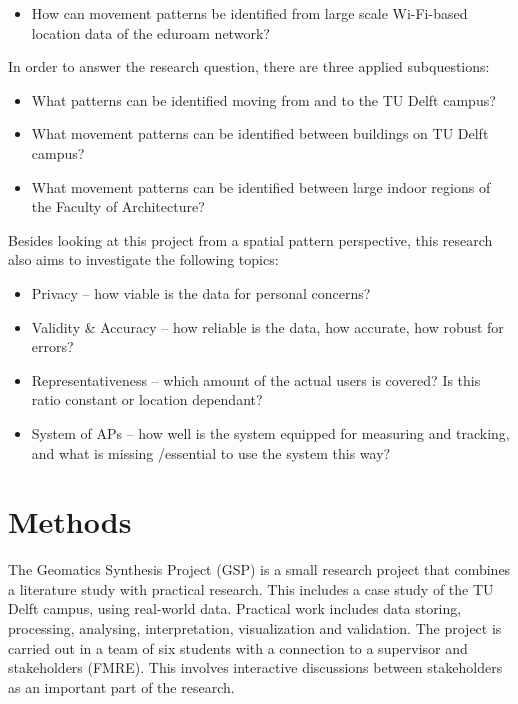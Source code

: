 \begin{itemize}
\item How can movement patterns be identified from large scale Wi-Fi-based location data of the eduroam network?
\end{itemize}
In order to answer the research question, there are three applied subquestions:
\begin{itemize}
\item What patterns can be identified moving from and to the TU Delft campus?
\item What movement patterns can be identified between buildings on TU Delft campus?
\item What movement patterns can be identified between large indoor regions of the Faculty of Architecture?
\end{itemize}
Besides looking at this project from a spatial pattern perspective, this research also aims to investigate the following topics:
\begin{itemize}
\item Privacy – how viable is the data for personal concerns?
\item Validity \& Accuracy – how reliable is the data, how accurate, how robust for errors?
\item Representativeness – which amount of the actual users is covered? Is this ratio constant or
location dependant? 
\item System of APs – how well is the system equipped for measuring and tracking, and what is missing /essential to use the system this way?
\end{itemize}

\section{Methods}\label{methods}
The Geomatics Synthesis Project (GSP) is a small research project that combines a literature study with practical research. This includes a case study of the TU Delft campus, using real-world data. Practical work includes data storing, processing, analysing, interpretation, visualization and validation. The project is carried out in a team of six students with a connection to a supervisor and stakeholders (FMRE). This involves interactive discussions between stakeholders as an important part of the research. 

